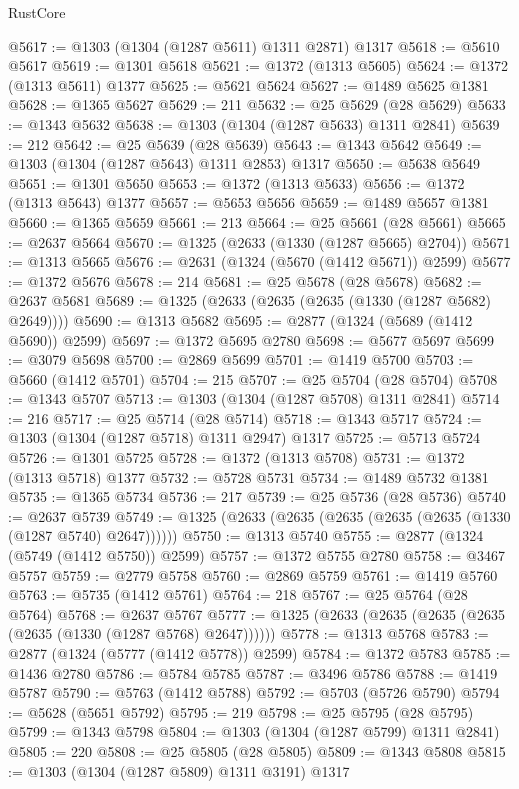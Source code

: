 \begin{lexlean}{RustCore}
\begin{coremodule}
@5617 := @1303 (@1304 (@1287 @5611) @1311 @2871) @1317
@5618 := @5610 @5617
@5619 := @1301 @5618
@5621 := @1372 (@1313 @5605)
@5624 := @1372 (@1313 @5611) @1377
@5625 := @5621 @5624
@5627 := @1489 @5625 @1381
@5628 := @1365 @5627
@5629 := 211
@5632 := @25 @5629 (@28 @5629)
@5633 := @1343 @5632
@5638 := @1303 (@1304 (@1287 @5633) @1311 @2841)
@5639 := 212
@5642 := @25 @5639 (@28 @5639)
@5643 := @1343 @5642
@5649 := @1303 (@1304 (@1287 @5643) @1311 @2853) @1317
@5650 := @5638 @5649
@5651 := @1301 @5650
@5653 := @1372 (@1313 @5633)
@5656 := @1372 (@1313 @5643) @1377
@5657 := @5653 @5656
@5659 := @1489 @5657 @1381
@5660 := @1365 @5659
@5661 := 213
@5664 := @25 @5661 (@28 @5661)
@5665 := @2637 @5664
@5670 := @1325 (@2633 (@1330 (@1287 @5665) @2704))
@5671 := @1313 @5665
@5676 := @2631 (@1324 (@5670 (@1412 @5671)) @2599)
@5677 := @1372 @5676
@5678 := 214
@5681 := @25 @5678 (@28 @5678)
@5682 := @2637 @5681
@5689 := @1325 (@2633 (@2635 (@2635 (@1330 (@1287 @5682) @2649))))
@5690 := @1313 @5682
@5695 := @2877 (@1324 (@5689 (@1412 @5690)) @2599)
@5697 := @1372 @5695 @2780
@5698 := @5677 @5697
@5699 := @3079 @5698
@5700 := @2869 @5699
@5701 := @1419 @5700
@5703 := @5660 (@1412 @5701)
@5704 := 215
@5707 := @25 @5704 (@28 @5704)
@5708 := @1343 @5707
@5713 := @1303 (@1304 (@1287 @5708) @1311 @2841)
@5714 := 216
@5717 := @25 @5714 (@28 @5714)
@5718 := @1343 @5717
@5724 := @1303 (@1304 (@1287 @5718) @1311 @2947) @1317
@5725 := @5713 @5724
@5726 := @1301 @5725
@5728 := @1372 (@1313 @5708)
@5731 := @1372 (@1313 @5718) @1377
@5732 := @5728 @5731
@5734 := @1489 @5732 @1381
@5735 := @1365 @5734
@5736 := 217
@5739 := @25 @5736 (@28 @5736)
@5740 := @2637 @5739
@5749 := @1325 (@2633 (@2635 (@2635 (@2635 (@2635 (@1330 (@1287 @5740) @2647))))))
@5750 := @1313 @5740
@5755 := @2877 (@1324 (@5749 (@1412 @5750)) @2599)
@5757 := @1372 @5755 @2780
@5758 := @3467 @5757
@5759 := @2779 @5758
@5760 := @2869 @5759
@5761 := @1419 @5760
@5763 := @5735 (@1412 @5761)
@5764 := 218
@5767 := @25 @5764 (@28 @5764)
@5768 := @2637 @5767
@5777 := @1325 (@2633 (@2635 (@2635 (@2635 (@2635 (@1330 (@1287 @5768) @2647))))))
@5778 := @1313 @5768
@5783 := @2877 (@1324 (@5777 (@1412 @5778)) @2599)
@5784 := @1372 @5783
@5785 := @1436 @2780
@5786 := @5784 @5785
@5787 := @3496 @5786
@5788 := @1419 @5787
@5790 := @5763 (@1412 @5788)
@5792 := @5703 (@5726 @5790)
@5794 := @5628 (@5651 @5792)
@5795 := 219
@5798 := @25 @5795 (@28 @5795)
@5799 := @1343 @5798
@5804 := @1303 (@1304 (@1287 @5799) @1311 @2841)
@5805 := 220
@5808 := @25 @5805 (@28 @5805)
@5809 := @1343 @5808
@5815 := @1303 (@1304 (@1287 @5809) @1311 @3191) @1317

\end{coremodule}
\end{lexlean}

